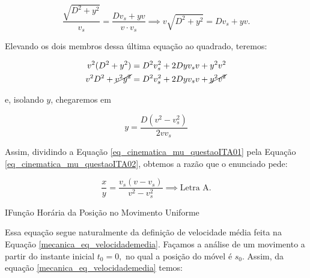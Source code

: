 \begin{exemplo}
$$ \dfrac{\sqrt{D^2+y^2}}{v_s} = \dfrac{Dv_s+yv}{v\cdot v_s}  \implies \boxed{v\sqrt{D^2+y^2}  = Dv_s+yv.} $$

Elevando os dois membros dessa última equação ao quadrado, teremos: 


\begin{align}
    v^2(D^2+y^2)&=D^2v_s^2+2Dyv_sv+y^2v^2 \nonumber \\
    v^2D^2+ \cancel{v^2y^2} &=D^2v_s^2+2Dyv_sv+ \cancel{y^2v^2} \nonumber
\end{align}

\noindent e, isolando $y$,
chegaremos em 





\begin{equation}
 \boxed{y = \dfrac{D(v^2-v_s^2)}{2vv_s}} 
 \label{eq_cinematica_mu_questaoITA02}
\end{equation}



Assim, dividindo a Equação \eqref{eq_cinematica_mu_questaoITA01} pela Equação \eqref{eq_cinematica_mu_questaoITA02}, obtemos a razão que o enunciado pede:

$$ \boxed{\dfrac{x}{y}=\dfrac{v_s(v-v_s)}{v^2-v_s^2} \implies \text{Letra A.}}$$

\end{exemplo}


\vspace{0.3cm}





















\begin{secnivel}
{I}{Função Horária da Posição no Movimento Uniforme}
 

  
\end{secnivel}
  








Essa equação segue naturalmente da definição de velocidade média feita na Equação \eqref{mecanica_eq_velocidademedia}. Façamos a análise de um movimento a partir do instante inicial $t_0=0,$ no qual a posição do móvel é $s_0.$ Assim, da equação \eqref{mecanica_eq_velocidademedia} temos:

